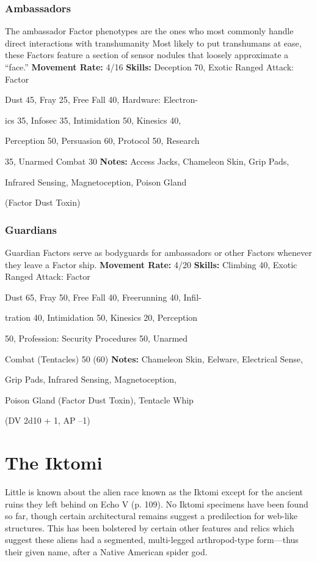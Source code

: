 \subsubsection{Ambassadors}

The ambassador Factor phenotypes are the ones who 
most commonly handle direct interactions with transhumanity
Most likely to put transhumans at ease,
these Factors feature a section of sensor nodules that 
loosely approximate a ``face.''
\textbf{Movement Rate: }4/16\textbf{ }
\textbf{Skills:} Deception 70, Exotic Ranged Attack: Factor 

Dust 45, Fray 25, Free Fall 40, Hardware: Electron-

ics 35, Infosec 35, Intimidation 50, Kinesics 40, 

Perception 50, Persuasion 60, Protocol 50, Research 

35, Unarmed Combat 30
\textbf{Notes:  }Access Jacks, Chameleon Skin, Grip Pads, 

Infrared Sensing, Magnetoception, Poison Gland 

(Factor Dust Toxin)

\subsubsection{Guardians}

Guardian Factors serve as bodyguards for ambassadors 
or other Factors whenever they leave a Factor ship.
\textbf{Movement Rate: }4/20\textbf{ }
\textbf{Skills:} Climbing 40, Exotic Ranged Attack: Factor 

Dust 65, Fray 50, Free Fall 40, Freerunning 40, Infil-

tration 40, Intimidation 50, Kinesics 20, Perception 

50, Profession: Security Procedures 50, Unarmed 

Combat (Tentacles) 50 (60)
\textbf{Notes:} Chameleon Skin, Eelware, Electrical Sense, 

Grip Pads, Infrared Sensing, Magnetoception, 

Poison Gland (Factor Dust Toxin), Tentacle Whip 

(DV 2d10 + 1, AP –1)

\section{The Iktomi}

Little is known about the alien race known as the 
Iktomi except for the ancient ruins they left behind 
on Echo V (p. 109). No Iktomi specimens have been 
found so far, though certain architectural remains 
suggest a predilection for web-like structures. This 
has been bolstered by certain other features and relics 
which suggest these aliens had a segmented, multi-legged
arthropod-type form—thus their given name,
after a Native American spider god.

